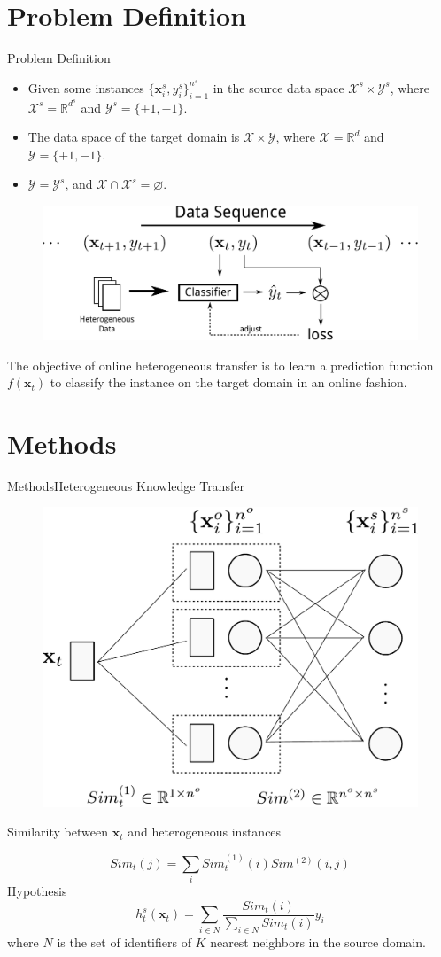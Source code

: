 \documentclass{beamer}
\begin{document}
\section{Problem Definition}
\begin{frame}{Problem Definition}
\begin{itemize}
\item
Given some instances $\{\mathbf{x}_{i}^{s}, y_{i}^{s}\}_{i=1}^{n^s}$ in the source data space $\mathcal{X}^{s} \times \mathcal{Y}^{s}$, where $\mathcal{X}^{s} = \mathbb{R}^{d^s}$ and $\mathcal{Y}^{s} = \{+1,-1\}$.
\item
The data space of the target domain is $\mathcal{X} \times \mathcal{Y}$, where $\mathcal{X} = \mathbb{R}^{d}$ and $\mathcal{Y} = \{+1,-1\}$.
\item
$\mathcal{Y} = \mathcal{Y}^{s}$, and $\mathcal{X} \cap \mathcal{X}^{s} = \varnothing$.
\end{itemize}
\begin{figure}
\centering
\includegraphics[height=0.25\textwidth]{problem.pdf}
\end{figure}
The objective of online heterogeneous transfer is to learn a prediction function $f(\mathbf{x}_{t})$ to classify the instance on the target domain in an online fashion.
\end{frame}

\section{Methods}
\begin{frame}{Methods}{Heterogeneous Knowledge Transfer}
\begin{figure}
\centering
\includegraphics[height=0.4\textwidth]{knowledgetransfer.pdf}
\end{figure}
Similarity between $\mathbf{x}_t$ and heterogeneous instances
\begin{footnotesize}
$$ Sim_t(j) = \sum\limits_i Sim_{t}^{(1)}(i) Sim^{(2)}(i,j) $$
Hypothesis
$$ h_{t}^{s}(\mathbf{x}_t) = \sum\limits_{i \in N} \frac{Sim_t(i)}{\sum\limits_{i \in N} Sim_t(i)} y_i $$
where $N$ is the set of identifiers of $K$ nearest neighbors in the source domain.
\end{footnotesize}
\end{frame}
\end{document}

